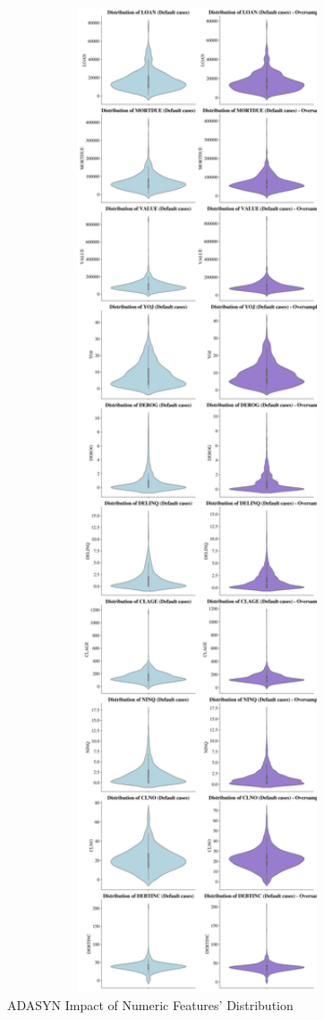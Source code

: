 \begin{figure}[H]
    \centering
    \caption{ADASYN Impact of Numeric Features' Distribution}\vspace{0.5em}
    \label{fig:adasynimpactnum}
    \includegraphics[width=140mm]{Figures/Numeric_Features_Distribution_OS_Violinplots.jpg}
    
    \vspace{-1em}
\end{figure}

